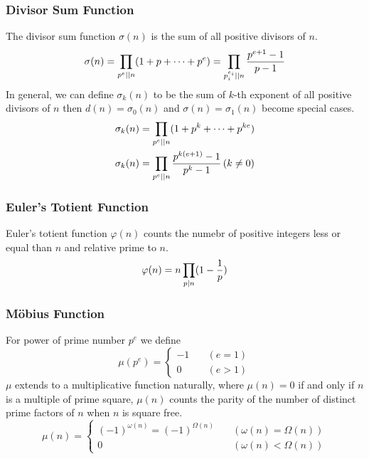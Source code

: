 \documentclass{article}
\begin{document}
\subsubsection*{Divisor Sum Function}
The divisor sum function $\sigma(n)$ is the sum of all positive divisors of $n$.
\begin{equation*}
\sigma(n) = \prod_{{p^e} \vert\vert n} (1 + p + \cdots + p^e)
= \prod_{p_i^{e_i} \vert\vert n} {p^{e + 1} - 1 \over p - 1}
\end{equation*}
In general, we can define $\sigma_k(n)$ to be the sum of $k$-th exponent of all
positive divisors of $n$ then $d(n) = \sigma_0(n)$ and $\sigma(n) = \sigma_1(n)$
become special cases.
\begin{align*}
\sigma_k(n) &= \prod_{p^e \vert\vert n} (1 + p^k + \cdots + p^{ke}) \\
\sigma_k(n) &= \prod_{p^e \vert\vert n} {p^{k(e + 1)} - 1 \over p^k - 1} \, (k \neq 0)
\end{align*}

\subsubsection*{Euler's Totient Function}
Euler's totient function $\varphi(n)$ counts the numebr of positive integers less or equal than
$n$ and relative prime to $n$.
$$\varphi(n) = n \prod_{p \vert n} (1 - {1 \over p})$$


\subsubsection*{M\"obius Function}
For power of prime number $p^e$ we define
\begin{equation*}
\mu(p^e) =
\begin{cases}
  -1 & \quad (e = 1) \\
  0  & \quad (e > 1)
\end{cases}
\end{equation*}
$\mu$ extends to a multiplicative function naturally, where $\mu(n) = 0$ if and only if $n$
is a multiple of prime square, $\mu(n)$ counts the parity of the number of distinct prime
factors of $n$ when $n$ is square free.
\begin{equation*}
\mu(n) =
\begin{cases}
  (-1)^{\omega(n)} = (-1)^{\Omega(n)} \quad & (\omega(n) = \Omega(n)) \\
  0 & (\omega(n) < \Omega(n))
\end{cases}
\end{equation*}
\end{document}
